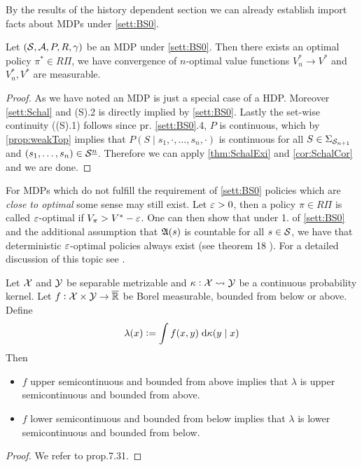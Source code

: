 By the results of the history dependent section we can already establish
import facts about MDPs under \cref{sett:BS0}.

\begin{prop}
  Let $(\mathcal{S}, \mathcal{A}, P, R, \gamma)$ be an MDP under \cref{sett:BS0}.
  Then there exists an optimal policy $\pi^* \in R\Pi$,
  we have convergence of $n$-optimal value functions $V_n^* \to V^*$ and
  $V^*_n, V^*$ are measurable.
\end{prop}
\begin{proof}
  As we have noted an MDP is just a special case of a HDP.
  Moreover \cref{sett:Schal} and (S).2 is directly implied by \cref{sett:BS0}.
  Lastly the set-wise continuity ((S).1) follows since pr. \cref{sett:BS0}.4,
  $P$ is continuous, which by \cref{prop:weakTop} implies that
  $P(S \mid s_1, \cdot, \dots, s_n, \cdot)$ is continuous for all
  $S \in \Sigma_{\mathcal{S}_{n+1}}$ and $(s_1, \dots, s_n) \in \mathcal{S}^{\underline{n}}$.
  Therefore we can apply \cref{thm:SchalExi} and \cref{cor:SchalCor}
  and we are done.
\end{proof}

\begin{rem}
  For MDPs which do not fulfill the requirement of
  \cref{sett:BS0} policies which are \emph{close to optimal} some sense
  may still exist. Let $\varepsilon > 0$, then a policy $\pi \in R\Pi$ is called
  $\varepsilon$-optimal if $V_\pi > V^* - \varepsilon$.
  One can then show that under 1. of \cref{sett:BS0}
  and the additional assumption that $\frak{A}(s)$ is countable for all
  $s \in \mathcal{S}$, we have that deterministic $\varepsilon$-optimal policies always exist
  (see theorem 18 ).
  For a detailed discussion of this topic see .
\end{rem}

\begin{prop}
  Let $\mathcal{X}$ and $\mathcal{Y}$ be separable metrizable and
  $\kappa : \mathcal{X} \leadsto \mathcal{Y}$ be a continuous probability
  kernel. Let $f : \mathcal{X} \times \mathcal{Y} \to \overline{\mathbb{R}}$ be Borel measurable,
  bounded from below or above. Define
  \[ \lambda(x) \vcentcolon= \int f(x, y) \; \mathrm{d} \kappa(y \mid x) \]
  Then
  \begin{itemize}
    \item $f$ upper semicontinuous and bounded from above implies that
      $\lambda$ is upper semicontinuous and bounded from above.
    \item $f$ lower semicontinuous and bounded from below implies that
      $\lambda$ is lower semicontinuous and bounded from below.
  \end{itemize}
  \label{prop:intSemiC}
\end{prop}
\begin{proof}
  We refer to  prop.7.31.
\end{proof}

